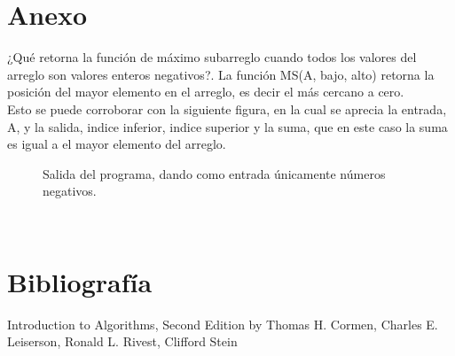 \documentclass[12pt,twoside]{article}
\newcommand{\addfigure}[4]{
        \begin{figure}[htbp!]
            \begin{center}	
                \fbox{\texttt{[image: \#2]}}
                \caption{#4}
                \label{#3}
            \end{center}
        \end{figure}
  }
\begin{document}
\section{Anexo}
¿Qué retorna la función de máximo subarreglo cuando todos los valores del arreglo son valores enteros negativos?.
La función MS(A, bajo, alto) retorna la posición del mayor elemento en el arreglo, es decir el más cercano a cero.
\\
Esto se puede corroborar con la siguiente figura, en la cual se aprecia la entrada, A, y la salida, indice inferior, indice superior y la suma, que en este caso la suma es igual a el mayor elemento del arreglo.\\
\addfigure{.5}{img_cinco/salAnexo}{fig:MS_Anexo}{Salida del programa, dando como entrada únicamente números negativos.}
\\
\section{Bibliograf\'ia}
 Introduction to Algorithms, Second Edition by Thomas H. Cormen, Charles E. Leiserson, Ronald L. Rivest, Clifford Stein
  
\end{document}
